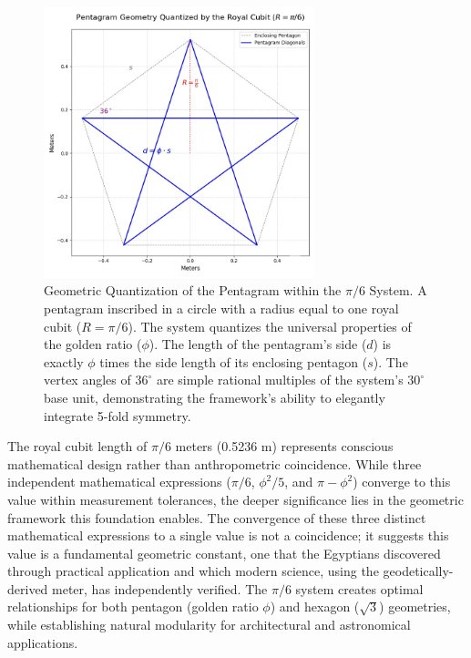 \documentclass[11pt]{article}
\begin{document}
\begin{figure}[h!]
\centering
\includegraphics[width=0.7\textwidth]{figures/pentagram-fig.jpeg}
\caption{Geometric Quantization of the Pentagram within the $\pi/6$ System. A pentagram inscribed in a circle with a radius equal to one royal cubit ($R = \pi/6$). The system quantizes the universal properties of the golden ratio ($\phi$). The length of the pentagram's side ($d$) is exactly $\phi$ times the side length of its enclosing pentagon ($s$). The vertex angles of $36^\circ$ are simple rational multiples of the system's $30^\circ$ base unit, demonstrating the framework's ability to elegantly integrate 5-fold symmetry.}
\label{fig:pentagram_quantization}
\end{figure}

The royal cubit length of $\pi/6$ meters (0.5236 m) represents conscious mathematical design rather than anthropometric coincidence. While three independent mathematical expressions ($\pi/6$, $\phi^2/5$, and $\pi - \phi^2$) converge to this value within measurement tolerances, the deeper significance lies in the geometric framework this foundation enables. The convergence of these three distinct mathematical expressions to a single value is not a coincidence; it suggests this value is a fundamental geometric constant, one that the Egyptians discovered through practical application and which modern science, using the geodetically-derived meter, has independently verified. The $\pi/6$ system creates optimal relationships for both pentagon (golden ratio $\phi$) and hexagon ($\sqrt{3}$) geometries, while establishing natural modularity for architectural and astronomical applications.
\end{document}
